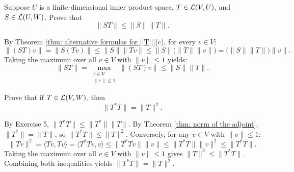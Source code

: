 \begin{xrcs}
  Suppose $U$ is a finite-dimensional inner product space, $T \in \mathcal{L}(V,U)$, and $S \in \mathcal{L}(U,W)$. Prove that
  \begin{equation}
    \|ST\| \leq \|S\| \|T\|.
  \end{equation}

\begin{xprf}
  By Theorem \ref{thm: alternative formulas for ||T||}(c), for every $v \in V$:
  \[
    \|(ST)v\| = \|S(Tv)\| \leq \|S\| \|Tv\| \leq \|S\| \big(\|T\| \|v\|\big) = \big(\|S\| \|T\|\big) \|v\|.
  \]
  Taking the maximum over all $v \in V$ with $\|v\| \le 1$ yields:
  \[
    \|ST\| = \max_{\substack{v \in V \\ \|v\| \leq 1}} \|(ST)v\| \leq \|S\| \|T\|.
  \]
\end{xprf}
\end{xrcs}

\begin{xrcs}
  Prove that if $T \in \mathcal{L}(V,W)$, then
  \begin{equation}
    \|T^*T\| = \|T\|^2.
  \end{equation}

\begin{xprf}
  By Exercise 5, $\|T^*T\| \le \|T^*\| \|T\|$.
  By Theorem \ref{thm: norm of the adjoint}, $\|T^*\| = \|T\|$, so $\|T^*T\| \le \|T\|^2$.
  Conversely, for any $v \in V$ with $\|v\| \le 1$:
  \[
    \|Tv\|^2 = \langle Tv, Tv \rangle = \langle T^*Tv, v \rangle \leq \|T^*Tv\| \|v\| \leq \|T^*T\| \|v\|^2 \leq \|T^*T\|.
  \]
  Taking the maximum over all $v \in V$ with $\|v\| \le 1$ gives $\|T\|^2 \le \|T^*T\|$.
  Combining both inequalities yields $\|T^*T\| = \|T\|^2$.
\end{xprf}
\end{xrcs}
